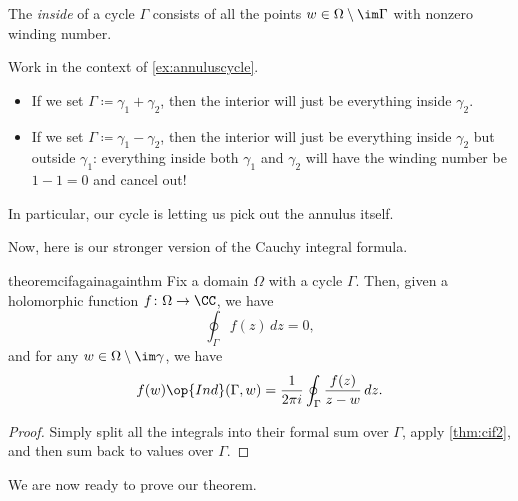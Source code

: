\documentclass[../notes.tex]{subfiles}
\begin{document}
\begin{definition}[Inside]
	The \textit{inside} of a cycle $\Gamma$ consists of all the points $w\in\Omega\setminus\im\Gamma$ with nonzero winding number.
\end{definition}
\begin{example} \label{ex:insideannulus}
	Work in the context of \autoref{ex:annuluscycle}.
	\begin{itemize}
		\item If we set $\Gamma\coloneqq\gamma_1+\gamma_2$, then the interior will just be everything inside $\gamma_2$.
		\item If we set $\Gamma\coloneqq\gamma_1-\gamma_2$, then the interior will just be everything inside $\gamma_2$ but outside $\gamma_1$: everything inside both $\gamma_1$ and $\gamma_2$ will have the winding number be $1-1=0$ and cancel out!
	\end{itemize}
	In particular, our cycle is letting us pick out the annulus itself.
\end{example}
Now, here is our stronger version of the Cauchy integral formula.
\begin{restatable}{theorem}{cifagainagainthm} \label{thm:cif3}
	Fix a domain $\Omega$ with a cycle $\Gamma$. Then, given a holomorphic function $f\colon\Omega\to\CC$, we have
	\[\oint_\Gamma f(z)\,dz=0,\]
	and for any $w\in\Omega\setminus\im\gamma$, we have
	\[f(w)\op{Ind}(\Gamma,w)=\frac1{2\pi i}\oint_\Gamma\frac{f(z)}{z-w}\,dz.\]
\end{restatable}
\begin{proof}
	Simply split all the integrals into their formal sum over $\Gamma$, apply \autoref{thm:cif2}, and then sum back to values over $\Gamma$.
\end{proof}
We are now ready to prove our theorem.
\end{document}
